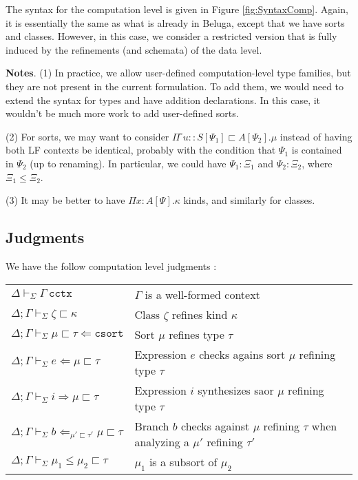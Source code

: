 \documentclass[letterpaper, 11pt]{article}
\newcommand{\Rar}{\Rightarrow}
\newcommand{\Lar}{\Leftarrow}
\newcommand{\csort}{\texttt{csort}}
\newcommand{\cctx}{\texttt{cctx}}
\begin{document}
    The syntax for the computation level is given in Figure \ref{fig:SyntaxComp}.  Again, it is essentially the same as what is already in Beluga, except
    that we have sorts and classes.  However, in this case, we consider a restricted version that is fully induced by the refinements (and schemata) of
    the data level.

    \textbf{Notes}. (1) In practice, we allow user-defined computation-level type families, but they are not present in the current formulation.  To add
    them, we would need to extend the syntax for types and have addition declarations.  In this case, it wouldn't be much more work to add user-defined
    sorts.

    (2) For sorts, we may want to consider $\Pi^\square u{::}S[\Psi_1] \sqsubset A[\Psi_2]. \mu$ instead of having both LF contexts be identical, probably
    with the condition that $\Psi_1$ is contained in $\Psi_2$ (up to renaming).  In particular, we could have $\Psi_1 {:} \Xi_1$ and $\Psi_2 {:} \Xi_2$,
    where $\Xi_1 \leq \Xi_2$.

    (3) It may be better to have $\Pi x{:}A[\Psi].\kappa$ kinds, and similarly for classes.

    \subsection{Judgments}
    We have the follow computation level judgments :

    \begin{tabular}{ll}
      $ \Delta \vdash_\Sigma \Gamma \ \cctx$                                         & $\Gamma$ is a well-formed context \\
      $ \Delta; \Gamma \vdash_\Sigma \zeta \sqsubset \kappa$                       & Class $\zeta$ refines kind $\kappa$ \\
      $ \Delta; \Gamma \vdash_\Sigma \mu \sqsubset \tau \Lar \csort$               & Sort $\mu$ refines type $\tau$ \\
      $ \Delta; \Gamma \vdash_\Sigma e \Lar \mu \sqsubset \tau$                    & Expression $e$ checks agains sort $\mu$ refining type $\tau$ \\
      $ \Delta; \Gamma \vdash_\Sigma i \Rar \mu \sqsubset \tau$                    & Expression $i$ synthesizes saor $\mu$ refining type $\tau$ \\
      $ \Delta; \Gamma \vdash_\Sigma b \Lar_{\mu' \sqsubset \tau'} \mu \sqsubset \tau$ & Branch $b$ checks against $\mu$ refining $\tau$ 
                                                                                           when analyzing a $\mu'$ refining $\tau'$ \\
      $ \Delta; \Gamma \vdash_\Sigma \mu_1 \leq \mu_2 \sqsubset \tau$              & $\mu_1$ is a subsort of $\mu_2$ 
    \end{tabular}
\end{document}
